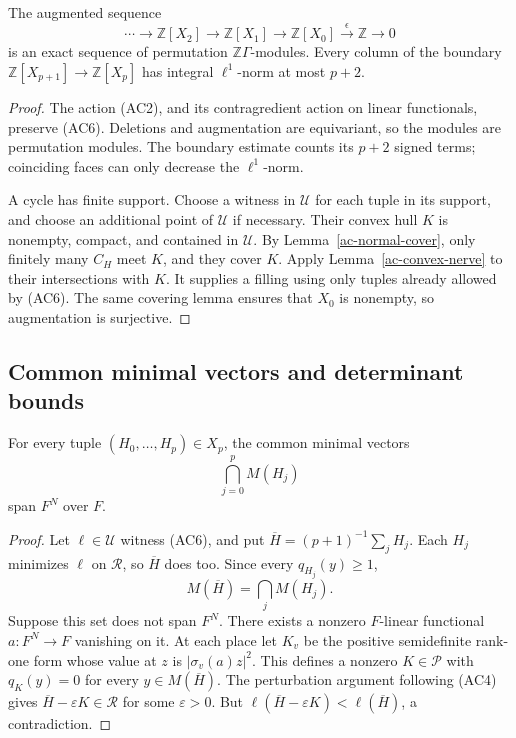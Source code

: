 \begin{theorem}\label{ac-exact}
The augmented sequence
\[
       \cdots\longrightarrow\mathbb Z[X_2]
       \longrightarrow\mathbb Z[X_1]
       \longrightarrow\mathbb Z[X_0]
       \overset{\epsilon}{\longrightarrow}\mathbb Z
       \longrightarrow0
\]
is an exact sequence of permutation $\mathbb Z\Gamma$-modules.
Every column of the boundary
$\mathbb Z[X_{p+1}]\to\mathbb Z[X_p]$ has integral
$\ell^1$-norm at most $p+2$.
\end{theorem}
\begin{proof}
The action (AC2), and its contragredient action on linear
functionals, preserve (AC6).  Deletions and augmentation are
equivariant, so the modules are permutation modules.
The boundary estimate counts its $p+2$ signed terms;
coinciding faces can only decrease the $\ell^1$-norm.

A cycle has finite support.  Choose a witness in $\mathcal U$
for each tuple in its support, and choose an additional point
of $\mathcal U$ if necessary.  Their convex hull $K$ is
nonempty, compact, and contained in $\mathcal U$.
By Lemma~\ref{ac-normal-cover}, only finitely many $C_H$
meet $K$, and they cover $K$.  Apply
Lemma~\ref{ac-convex-nerve} to their intersections with $K$.
It supplies a filling using only tuples already allowed
by (AC6).  The same covering lemma ensures that $X_0$
is nonempty, so augmentation is surjective.
\end{proof}

\subsection{Common minimal vectors and determinant bounds}

\begin{lemma}\label{ac-common-minima}
For every tuple $(H_0,\ldots,H_p)\in X_p$, the common minimal
vectors
\[
                 \bigcap_{j=0}^p M(H_j)
\]
span $F^N$ over $F$.
\end{lemma}
\begin{proof}
Let $\ell\in\mathcal U$ witness (AC6), and put
$\overline H=(p+1)^{-1}\sum_jH_j$.
Each $H_j$ minimizes $\ell$ on $\mathcal R$, so
$\overline H$ does too.  Since every $q_{H_j}(y)\ge1$,
\[
                  M(\overline H)=\bigcap_jM(H_j).
\]
Suppose this set does not span $F^N$.  There exists a nonzero
$F$-linear functional $a:F^N\to F$ vanishing on it.
At each place let $K_v$ be the positive semidefinite rank-one
form whose value at $z$ is $|\sigma_v(a)z|^2$.
This defines a nonzero $K\in\mathcal P$ with
$q_K(y)=0$ for every $y\in M(\overline H)$.
The perturbation argument following (AC4) gives
$\overline H-\varepsilon K\in\mathcal R$ for some
$\varepsilon>0$.  But
$\ell(\overline H-\varepsilon K)<\ell(\overline H)$,
a contradiction.
\end{proof}

